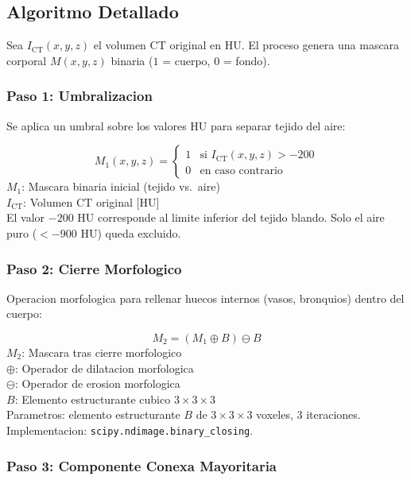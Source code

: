 \documentclass[12pt,a4paper]{article}
\newcommand{\vardef}[2]{\noindent\textbf{#1}: #2\\}
\begin{document}
\subsection{Algoritmo Detallado}

Sea $I_{\text{CT}}(x,y,z)$ el volumen CT original en HU. El proceso genera una mascara corporal
$M(x,y,z)$ binaria ($1$ = cuerpo, $0$ = fondo).

\subsubsection{Paso 1: Umbralizacion}

Se aplica un umbral sobre los valores HU para separar tejido del aire:

\begin{equation}\label{eq:umbral}
    M_1(x,y,z) = \begin{cases}
        1 & \text{si } I_{\text{CT}}(x,y,z) > -200 \\
        0 & \text{en caso contrario}
    \end{cases}
\end{equation}
\vardef{$M_1$}{Mascara binaria inicial (tejido vs.\ aire)}
\vardef{$I_{\text{CT}}$}{Volumen CT original [HU]}

El valor $-200$ HU corresponde al limite inferior del tejido blando.
Solo el aire puro ($<-900$ HU) queda excluido.

\subsubsection{Paso 2: Cierre Morfologico}

Operacion morfologica para rellenar huecos internos (vasos, bronquios) dentro del cuerpo:

\begin{equation}\label{eq:cierre}
    M_2 = (M_1 \oplus B) \ominus B
\end{equation}
\vardef{$M_2$}{Mascara tras cierre morfologico}
\vardef{$\oplus$}{Operador de dilatacion morfologica}
\vardef{$\ominus$}{Operador de erosion morfologica}
\vardef{$B$}{Elemento estructurante cubico $3\times3\times3$}

Parametros: elemento estructurante $B$ de $3 \times 3 \times 3$ voxeles, 3 iteraciones.
Implementacion: \texttt{scipy.ndimage.binary\_closing}.

\subsubsection{Paso 3: Componente Conexa Mayoritaria}
\end{document}
